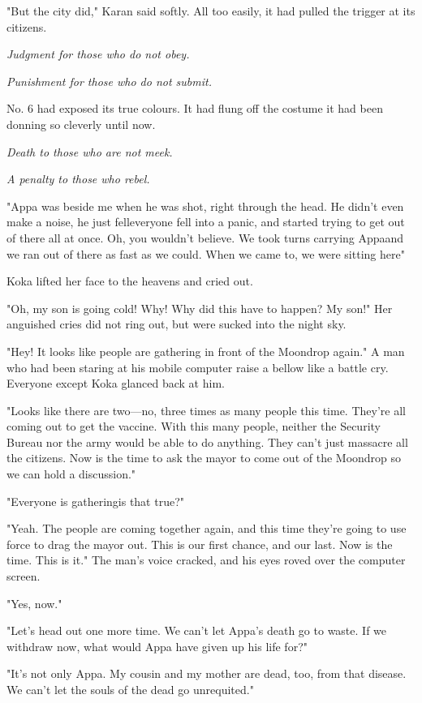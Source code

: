 "But the city did," Karan said softly. All too easily, it had pulled the
trigger at its citizens.

\emph{Judgment for those who do not obey.}

\emph{Punishment for those who do not submit.}

No. 6 had exposed its true colours. It had flung off the costume it had
been donning so cleverly until now.

\emph{Death to those who are not meek.}

\emph{A penalty to those who rebel.}

"Appa was beside me when he was shot, right through the head. He didn't
even make a noise, he just fell\el everyone fell into a panic, and
started trying to get out of there all at once. Oh, you wouldn't
believe. We took turns carrying Appa\el and we ran out of there as fast
as we could. When we came to, we were sitting here\el "

Koka lifted her face to the heavens and cried out.

"Oh, my son is going cold! Why! Why did this have to happen? My son!"
Her anguished cries did not ring out, but were sucked into the night
sky.

"Hey! It looks like people are gathering in front of the Moondrop
again." A man who had been staring at his mobile computer raise a bellow
like a battle cry. Everyone except Koka glanced back at him.

"Looks like there are two---no, three times as many people this time.
They're all coming out to get the vaccine. With this many people,
neither the Security Bureau nor the army would be able to do anything.
They can't just massacre all the citizens. Now is the time to ask the
mayor to come out of the Moondrop so we can hold a discussion."

"Everyone is gathering\el is that true?"

"Yeah. The people are coming together again, and this time they're going
to use force to drag the mayor out. This is our first chance, and our
last. Now is the time. This is it." The man's voice cracked, and his
eyes roved over the computer screen.

"Yes, now."

"Let's head out one more time. We can't let Appa's death go to waste. If
we withdraw now, what would Appa have given up his life for?"

"It's not only Appa. My cousin and my mother are dead, too, from that
disease. We can't let the souls of the dead go unrequited."

